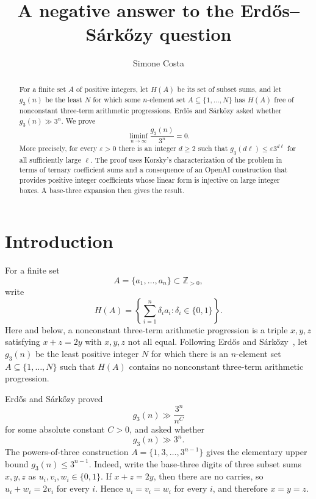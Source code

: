 \documentclass[10pt,a4paper]{amsart}
\title{A negative answer to the Erd\H{o}s--S\'ark\H{o}zy question}
\author{Simone Costa}
\date{}
\theoremstyle{remark}
\newcommand{\Z}{\mathbb Z}
\newcommand{\ee}{\varepsilon}
\begin{document}
\begin{abstract}
For a finite set $A$ of positive integers, let $H(A)$ be its set of subset sums, and let $g_3(n)$ be the least $N$ for which some $n$-element set $A\subseteq\{1,\ldots,N\}$ has $H(A)$ free of nonconstant three-term arithmetic progressions. Erd\H{o}s and S\'ark\H{o}zy asked whether $g_3(n)\gg 3^n$. We prove
\[
  \liminf_{n\to\infty}\frac{g_3(n)}{3^n}=0.
\]
More precisely, for every $\ee>0$ there is an integer $d\ge2$ such that
$g_3(d\ell)\le \ee 3^{d\ell}$ for all sufficiently large $\ell$.
The proof uses Korsky's characterization of the problem in terms of ternary coefficient sums and a consequence of an OpenAI construction that provides positive integer coefficients whose linear form is injective on large integer boxes. A base-three expansion then gives the result.
\end{abstract}

\maketitle

\section{Introduction}

For a finite set
\[
 A=\{a_1,\ldots,a_n\}\subset\Z_{>0},
\]
write
\[
 H(A)=\left\{\sum_{i=1}^n \delta_i a_i:\delta_i\in\{0,1\}\right\}.
\]
Here and below, a nonconstant three-term arithmetic progression is a triple $x,y,z$ satisfying $x+z=2y$ with $x,y,z$ not all equal. Following Erd\H{o}s and S\'ark\H{o}zy~\cite{ErdosSarkozy1992}, let $g_3(n)$ be the least positive integer $N$ for which there is an $n$-element set $A\subseteq\{1,\ldots,N\}$ such that $H(A)$ contains no nonconstant three-term arithmetic progression.

Erd\H{o}s and S\'ark\H{o}zy proved
\[
 g_3(n)\gg \frac{3^n}{n^C}
\]
for some absolute constant $C>0$, and asked whether
\[
 g_3(n)\gg 3^n.
\]
The powers-of-three construction $A=\{1,3,\ldots,3^{n-1}\}$ gives the elementary upper bound $g_3(n)\le 3^{n-1}$. Indeed, write the base-three digits of three subset sums $x,y,z$ as $u_i,v_i,w_i\in\{0,1\}$. If $x+z=2y$, then there are no carries, so $u_i+w_i=2v_i$ for every $i$. Hence $u_i=v_i=w_i$ for every $i$, and therefore $x=y=z$.
\end{document}
